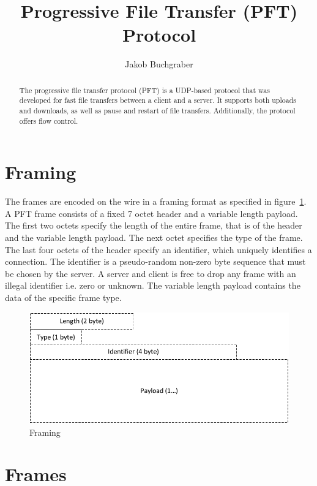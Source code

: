 \documentclass[]{article}
\begin{document}
\title{Progressive File Transfer (PFT) Protocol}
\author{
	Jakob Buchgraber
	}

\maketitle
\tableofcontents
\newpage

\begin{abstract}
The progressive file transfer protocol (PFT) is a UDP-based protocol
that was developed for fast file transfers between a client and a
server. It supports both uploads and downloads, as well as pause
and restart of file transfers. Additionally, the protocol offers
flow control.
\end{abstract}


\section{Framing}

The frames are encoded on the wire in a framing format as specified in figure~\ref{framing}.
A PFT frame consists of a fixed 7 octet header and a variable length payload. The first
two octets specify the length of the entire frame, that is of the header and the variable
length payload. The next octet specifies the type of the frame. The last four octets of
the header specify an identifier, which uniquely identifies a connection. The identifier
is a pseudo-random non-zero byte sequence that must be chosen by the server. A server and
client is free to drop any frame with an illegal identifier i.e. zero or unknown. The variable length payload
contains the data of the specific frame type.

\begin{figure}[H]
\centering
\includegraphics[width=\textwidth]{frames/framing.pdf}
\caption{Framing}
\label{framing}
\end{figure}

\section{Frames}
\end{document}
